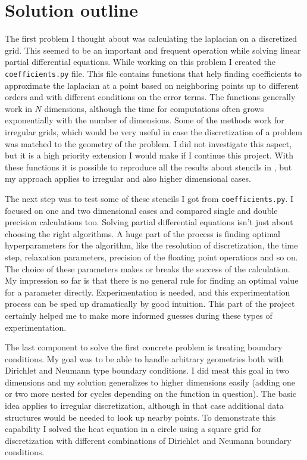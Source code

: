\documentclass[pdftex,12pt,a4paper]{article}
\newcommand{\ctexttt}[1]{\colorbox{cverbbg}{\texttt{#1}}}
\begin{document}
	\section{Solution outline}
		The first problem I thought about was calculating the laplacian on a discretized grid. This seemed to be an important and frequent operation while solving linear partial differential equations. While working on this problem I created the \ctexttt{coefficients.py} file. This file contains functions that help finding coefficients to approximate the laplacian at a point based on neighboring points up to different orders and with different conditions on the error terms. The functions generally work in $N$ dimensions, although the time for computations often grows exponentially with the number of dimensions. Some of the methods work for irregular grids, which would be very useful in case the discretization of a problem was matched to the geometry of the problem. I did not investigate this aspect, but it is a high priority extension I would make if I continue this project. With these functions it is possible to reproduce all the results about stencils in \cite{patra}, but my approach applies to irregular and also higher dimensional cases.
		
		The next step was to test some of these stencils I got from \ctexttt{coefficients.py}. I focused on one and two dimensional cases and compared single and double precision calculations too. Solving partial differential equations isn't just about choosing the right algorithms. A huge part of the process is finding optimal hyperparameters for the algorithm, like the resolution of discretization, the time step, relaxation parameters, precision of the floating point operations and so on. The choice of these parameters makes or breaks the success of the calculation. My impression so far is that there is no general rule for finding an optimal value for a parameter directly. Experimentation is needed, and this experimentation process can be sped up dramatically by good intuition. This part of the project certainly helped me to make more informed guesses during these types of experimentation.
		
		The last component to solve the first concrete problem is treating boundary conditions. My goal was to be able to handle arbitrary geometries both with Dirichlet and Neumann type boundary conditions. I did meat this goal in two dimensions and my solution generalizes to higher dimensions easily (adding one or two more nested for cycles depending on the function in question). The basic idea applies to irregular discretization, although in that case additional data structures would be needed to look up nearby points. To demonstrate this capability I solved the heat equation in a circle using a square grid for discretization with different combinations of Dirichlet and Neumann boundary conditions. \cite{gaussian,conduction}
\end{document}
